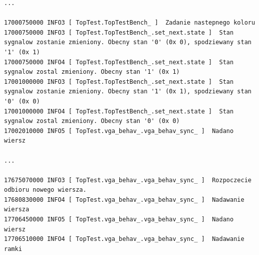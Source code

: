 \documentclass[a4paper,12pt]{article}
\begin{document}
\begin{lstlisting}[label=Vga_output,caption=Vga logs output]
...

17000750000 INFO3 [ TopTest.TopTestBench_ ]  Zadanie nastepnego koloru
17000750000 INFO3 [ TopTest.TopTestBench_.set_next.state ]  Stan sygnalow zostanie zmieniony. Obecny stan '0' (0x 0), spodziewany stan '1' (0x 1)
17000750000 INFO4 [ TopTest.TopTestBench_.set_next.state ]  Stan sygnalow zostal zmieniony. Obecny stan '1' (0x 1)
17001000000 INFO3 [ TopTest.TopTestBench_.set_next.state ]  Stan sygnalow zostanie zmieniony. Obecny stan '1' (0x 1), spodziewany stan '0' (0x 0)
17001000000 INFO4 [ TopTest.TopTestBench_.set_next.state ]  Stan sygnalow zostal zmieniony. Obecny stan '0' (0x 0)
17002010000 INFO5 [ TopTest.vga_behav_.vga_behav_sync_ ]  Nadano  wiersz

...

17675070000 INFO3 [ TopTest.vga_behav_.vga_behav_sync_ ]  Rozpoczecie odbioru nowego wiersza.
17680830000 INFO4 [ TopTest.vga_behav_.vga_behav_sync_ ]  Nadawanie wiersza
17706450000 INFO5 [ TopTest.vga_behav_.vga_behav_sync_ ]  Nadano  wiersz
17706510000 INFO4 [ TopTest.vga_behav_.vga_behav_sync_ ]  Nadawanie ramki
\end{lstlisting}


\newpage
\end{document}
